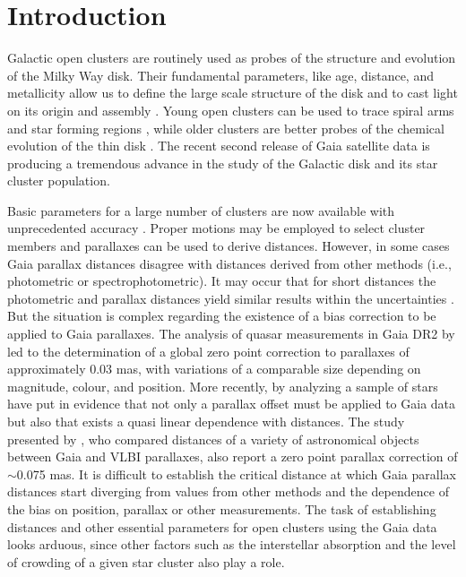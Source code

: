 \documentclass[referee]{aa}
\begin{document}
\section{Introduction}

Galactic open clusters are routinely used as probes of the structure and
evolution of the Milky Way disk. Their fundamental parameters, like age,
distance, and metallicity allow us to define the large scale structure of the
disk and to cast light on its origin and assembly \citep{Janes_1982,
Moitinho_2010,2018A&A...618A..93C}. Young open clusters can be used to trace
spiral arms and star forming regions \citep{Moitinho_2006,Vazquez2008}, while
older clusters are better probes of the chemical evolution of the thin disk
\citep{2009yCat..35120063M}. The recent second release of Gaia satellite data
\citep{GaiaDR2_2018} is producing a tremendous advance in the study of the
Galactic disk and its star cluster population.

Basic parameters for a large number of clusters are now available with
unprecedented accuracy \citep{2018A&A...618A..93C,Soubiran_2018,Bossini_2019,
Monteiro_2019}. Proper motions may be employed to select cluster members and
parallaxes can be used to derive distances. However, in some cases Gaia
parallax distances disagree with distances derived from other methods 
(i.e., photometric or spectrophotometric). It may occur that for
short distances the photometric and parallax distances yield similar results
within the uncertainties \citep{2018A&A...618A..93C}. But the situation is
complex regarding the existence of a bias correction to be applied to
Gaia parallaxes. The analysis of quasar measurements in Gaia DR2 by
\cite{Lindegren_2018} led to the determination of a global zero point
correction to parallaxes of approximately 0.03 mas, with variations of a
comparable size depending on magnitude, colour, and position.
More recently, by analyzing a sample of stars \cite{Schonrich2019} have put in
evidence that not only a parallax offset must be applied to Gaia data but also
that exists a quasi linear dependence with distances. The study presented by 
\cite{Xu_2019}, who compared distances of a variety of astronomical objects
between Gaia and VLBI parallaxes, also report a zero point parallax correction
of $\sim$0.075 mas.
It is difficult to establish the critical distance at which Gaia parallax
distances start diverging from values from other methods and the dependence of
the bias on position, parallax or other measurements. The  task of
establishing distances and other essential parameters for open clusters using
the Gaia data looks arduous, since other factors such as the interstellar
absorption and the level of crowding of a given star cluster also play a
role.
\end{document}
